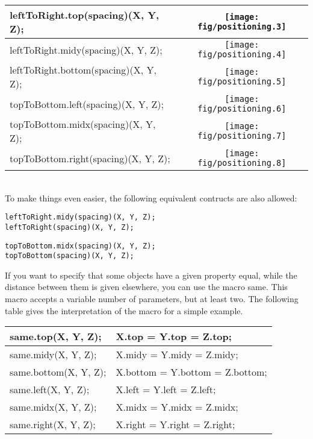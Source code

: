 \documentclass{article}
\newcommand{\code}{\ttfamily}
\begin{document}
\begin{tabular}{||l|c||}
\hline
{\code leftToRight.top(spacing)(X, Y, Z);} & \texttt{[image: fig/positioning.3]} \\
\hline
{\code leftToRight.midy(spacing)(X, Y, Z);} & \texttt{[image: fig/positioning.4]} \\
\hline
{\code leftToRight.bottom(spacing)(X, Y, Z);} & \texttt{[image: fig/positioning.5]} \\
\hline
{\code topToBottom.left(spacing)(X, Y, Z);} & \texttt{[image: fig/positioning.6]} \\
\hline
{\code topToBottom.midx(spacing)(X, Y, Z);} & \texttt{[image: fig/positioning.7]} \\
\hline
{\code topToBottom.right(spacing)(X, Y, Z);} & \texttt{[image: fig/positioning.8]} \\
\hline
\end{tabular} \\

To make things even easier, the following equivalent contructs are also allowed:

\begin{verbatim}
leftToRight.midy(spacing)(X, Y, Z);
leftToRight(spacing)(X, Y, Z);
\end{verbatim}

\begin{verbatim}
topToBottom.midx(spacing)(X, Y, Z);
topToBottom(spacing)(X, Y, Z);
\end{verbatim}

If you want to specify that some objects have a given property equal, while the distance between them is given elsewhere, you can use the macro {\code same}.
This macro accepts a variable number of parameters, but at least two. The following table gives the interpretation of the macro for a simple example.

\begin{tabular}{||l|l||}
\hline
{\code same.top(X, Y, Z);} & {\code X.top = Y.top = Z.top;} \\
\hline
{\code same.midy(X, Y, Z);} & {\code X.midy = Y.midy = Z.midy;} \\
\hline
{\code same.bottom(X, Y, Z);} & {\code X.bottom = Y.bottom = Z.bottom;} \\
\hline
{\code same.left(X, Y, Z);} & {\code X.left = Y.left = Z.left;} \\
\hline
{\code same.midx(X, Y, Z);} & {\code X.midx = Y.midx = Z.midx;} \\
\hline
{\code same.right(X, Y, Z);} & {\code X.right = Y.right = Z.right;} \\
\hline
\end{tabular} \\
\end{document}
